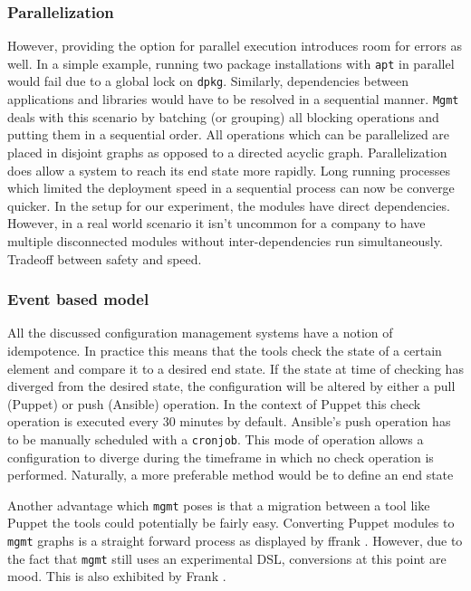 \subsubsection{Parallelization}
However, providing the option for parallel execution introduces room for errors as well. In a simple example, running two package installations with \texttt{apt} in parallel would fail due to a global lock on \texttt{dpkg}. Similarly, dependencies between applications and libraries would have to be resolved in a sequential manner. \texttt{Mgmt} deals with this scenario by batching (or grouping) all blocking operations and putting them in a sequential order. All operations which can be parallelized are placed in disjoint graphs as opposed to a directed acyclic graph. Parallelization does allow a system to reach its end state more rapidly. Long running processes which limited the deployment speed in a sequential process can now be converge quicker. In the setup for our experiment, the modules have direct dependencies. However, in a real world scenario it isn't uncommon for a company to have multiple disconnected modules without inter-dependencies run simultaneously. Tradeoff between safety and speed. 

\subsubsection{Event based model}
All the discussed configuration management systems have a notion of idempotence. In practice this means that the tools check the state of a certain element and compare it to a desired end state. If the state at time of checking has diverged from the desired state, the configuration will be altered by either a pull (Puppet) or push (Ansible) operation. In the context of Puppet this check operation is executed every 30 minutes by default. Ansible's push operation has to be manually scheduled with a \texttt{cronjob}. This mode of operation allows a configuration to diverge during the timeframe in which no check operation is performed. Naturally, a more preferable method would be to define an end state 

Another advantage which \texttt{mgmt} poses is that a migration between a tool like Puppet the tools could potentially be fairly easy. Converting Puppet modules to \texttt{mgmt} graphs is a straight forward process as displayed by ffrank \cite{}. However, due to the fact that \texttt{mgmt} still uses an experimental DSL, conversions at this point are mood. This is also exhibited by Frank \cite{}. 
